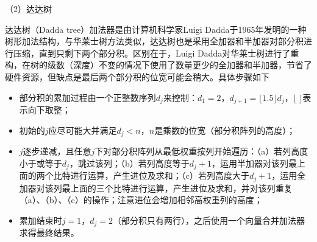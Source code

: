 （2）达达树

达达树（Dadda tree）加法器是由计算机科学家Luigi Dadda于1965年发明的一种树形加法结构\cite{EM:Dadda}，与华莱士树方法类似，达达树也是采用全加器和半加器对部分积进行压缩，直到只剩下两个部分积。区别在于，Luigi Dadda对华莱士树进行了重构，在树的级数（深度）不变的情况下使用了数量更少的全加器和半加器，节省了硬件资源，但缺点是最后两个部分积的位宽可能会稍大。具体步骤如下%
\begin{itemize}
    \item 部分积的累加过程由一个正整数序列$d_j$来控制：$d_1=2$，$d_{j+1}=\lfloor 1.5 \rfloor d_j$，$\lfloor \ \rfloor$表示向下取整；
    \item 初始的$j$应尽可能大并满足$d_j < n$，$n$是乘数的位宽（部分积阵列的高度）；
    \item $j$逐步递减，且任意$j$下对部分积阵列从最低权重按列开始遍历：（a）若列高度小于或等于$d_j$，跳过该列；（b）若列高度等于$d_j+1$，运用半加器对该列最上面的两个比特进行运算，产生进位及求和；（c）若列高度大于$d_j+1$，运用全加器对该列最上面的三个比特进行运算，产生进位及求和，并对该列重复（a）、（b）、（c）的操作；注意进位会增加相邻高权重列的高度；
    \item 累加结束时$j=1$，$d_j=2$（部分积只有两行），之后使用一个向量合并加法器求得最终结果。
\end{itemize}

